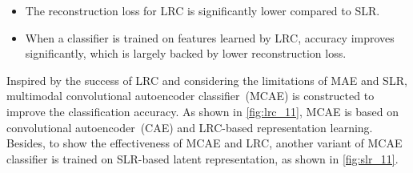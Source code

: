 \begin{itemize}[noitemsep]
    \item The reconstruction loss for LRC is significantly lower compared to SLR.
    \item When a classifier is trained on features learned by LRC, accuracy improves significantly, which is largely backed by lower reconstruction loss. 
\end{itemize}

\hspace*{3.5mm} Inspired by the success of LRC and considering the limitations of MAE and SLR, multimodal convolutional autoencoder classifier~(MCAE) is constructed to improve the classification accuracy. As shown in \cref{fig:lrc_11}, MCAE is based on convolutional autoencoder~(CAE) and LRC-based representation learning. Besides, to show the effectiveness of MCAE and LRC, another variant of MCAE classifier is trained on SLR-based latent representation, as shown in \cref{fig:slr_11}. 

